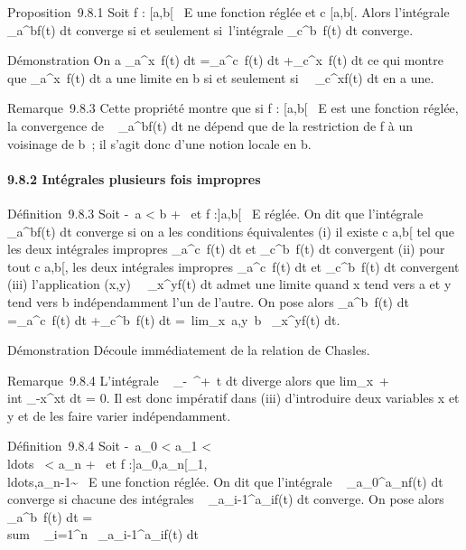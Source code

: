 \documentclass[]{article}
\begin{document}
Proposition~9.8.1 Soit f : {[}a,b{[}\rightarrow~ E une fonction réglée et c \in
{[}a,b{[}. Alors l'intégrale \int ~
\_a^bf(t) dt converge si et seulement si~l'intégrale
\int  \_c^b~f(t) dt converge.

Démonstration On a \int  \_a^x~f(t)
dt =\int  \_a^c~f(t) dt
+\int  \_c^x~f(t) dt ce qui montre
que \int  \_a^x~f(t) dt a une
limite en b si et seulement si~\int ~
\_c^xf(t) dt en a une.

Remarque~9.8.3 Cette propriété montre que si f : {[}a,b{[}\rightarrow~ E est une
fonction réglée, la convergence de \int ~
\_a^bf(t) dt ne dépend que de la restriction de f à un
voisinage de b~; il s'agit donc d'une notion locale en b.

\paragraph{9.8.2 Intégrales plusieurs fois impropres}

Définition~9.8.3 Soit -\infty~\leq a \textless{} b \leq +\infty~ et f :{]}a,b{[}\rightarrow~ E
réglée. On dit que l'intégrale \int ~
\_a^bf(t) dt converge si on a les conditions équivalentes
(i) il existe c \in{]}a,b{[} tel que les deux intégrales impropres
\int  \_a^c~f(t) dt et
\int  \_c^b~f(t) dt convergent (ii)
pour tout c \in{]}a,b{[}, les deux intégrales impropres
\int  \_a^c~f(t) dt et
\int  \_c^b~f(t) dt convergent
(iii) l'application
(x,y)\mapsto~\int ~
\_x^yf(t) dt admet une limite quand x tend vers a et y tend
vers b indépendamment l'un de l'autre. On pose alors
\int  \_a^b~f(t) dt
=\int  \_a^c~f(t) dt
+\int  \_c^b~f(t) dt
=\
lim\_x\rightarrow~a,y\rightarrow~b\int ~
\_x^yf(t) dt.

Démonstration Découle immédiatement de la relation de Chasles.

Remarque~9.8.4 L'intégrale \int ~
\_-\infty~^+\infty~t dt diverge alors que
lim\_x\rightarrow~+\infty~~\\int
 \_-x^xt dt = 0. Il est donc impératif dans (iii)
d'introduire deux variables x et y et de les faire varier
indépendamment.

Définition~9.8.4 Soit -\infty~\leq a\_0 \textless{} a\_1
\textless{} \\ldots~
\textless{} a\_n \leq +\infty~ et f
:{]}a\_0,a\_n{[}\diagdown\a\_1,\\ldots,a\_n-1\~
\rightarrow~ E une fonction réglée. On dit que l'intégrale
\int ~
\_a\_0^a\_nf(t) dt converge si chacune des
intégrales \int ~
\_a\_i-1^a\_if(t) dt converge. On pose
alors \int  \_a^b~f(t) dt
= \\sum ~
\_i=1^n\int ~
\_a\_i-1^a\_if(t) dt
\end{document}
